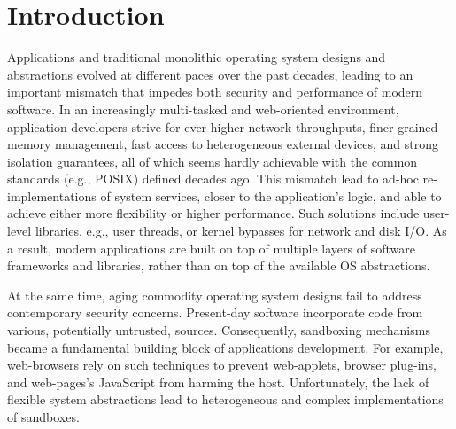 \section{Introduction}

%	
%	

Applications and traditional monolithic operating system designs and abstractions evolved at different paces over the past decades, leading to an important mismatch that impedes both security and performance of modern software.
In an increasingly multi-tasked and web-oriented environment, application developers strive for ever higher network throughputs, finer-grained memory management, fast access to heterogeneous external devices, and strong isolation guarantees, all of which seems hardly achievable with the common standards (e.g., POSIX) defined decades ago.
This mismatch lead to ad-hoc re-implementations of system services, closer to the application's logic, and able to achieve either more flexibility or higher performance.
Such solutions include user-level libraries, e.g., user threads\cite{golang}, or kernel bypasses for network and disk I/O\cite{DBLP:conf/nsdi/NanavatiWW17,intel2014data,intel2016storage,BelayPKGKB14}.
As a result, modern applications are built on top of multiple layers of software frameworks and libraries, rather than on top of the available OS abstractions.

At the same time, aging commodity operating system designs fail to address contemporary security concerns.
Present-day software incorporate code from various, potentially untrusted, sources.
Consequently, sandboxing mechanisms became a fundamental building block of applications development.
For example, web-browsers rely on such techniques to prevent web-applets, browser plug-ins, and web-pages's JavaScript from harming the host.
Unfortunately, the lack of flexible system abstractions lead to heterogeneous and complex implementations of sandboxes.

